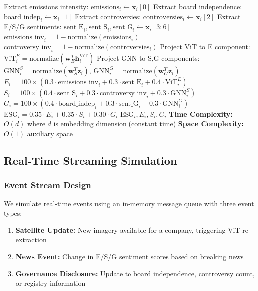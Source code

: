 \begin{algorithm}[H]
\caption{ESG Score Computation}
\label{alg:esg_scoring}
\BlankLine
{}
Extract emissions intensity: $\text{emissions}_i \gets \mathbf{x}_i[0]$\;
Extract board independence: $\text{board\_indep}_i \gets \mathbf{x}_i[1]$\;
Extract controversies: $\text{controversies}_i \gets \mathbf{x}_i[2]$\;
Extract E/S/G sentiments: $\text{sent\_E}_i, \text{sent\_S}_i, \text{sent\_G}_i \gets \mathbf{x}_i[3:6]$\;
\BlankLine
{}
$\text{emissions\_inv}_i = 1 - \text{normalize}(\text{emissions}_i)$\;
$\text{controversy\_inv}_i = 1 - \text{normalize}(\text{controversies}_i)$\;
Project ViT to E component: $\text{ViT}_i^E = \text{normalize}(\mathbf{w}_E^T \mathbf{h}_i^{\text{ViT}})$\;
Project GNN to S,G components: $\text{GNN}_i^S = \text{normalize}(\mathbf{w}_S^T \mathbf{z}_i)$, $\text{GNN}_i^G = \text{normalize}(\mathbf{w}_G^T \mathbf{z}_i)$\;
\BlankLine
{}
$E_i = 100 \times (0.3 \cdot \text{emissions\_inv}_i + 0.3 \cdot \text{sent\_E}_i + 0.4 \cdot \text{ViT}_i^E)$\;
$S_i = 100 \times (0.4 \cdot \text{sent\_S}_i + 0.3 \cdot \text{controversy\_inv}_i + 0.3 \cdot \text{GNN}_i^S)$\;
$G_i = 100 \times (0.4 \cdot \text{board\_indep}_i + 0.3 \cdot \text{sent\_G}_i + 0.3 \cdot \text{GNN}_i^G)$\;
\BlankLine
{}
$\text{ESG}_i = 0.35 \cdot E_i + 0.35 \cdot S_i + 0.30 \cdot G_i$\;
\Return $\text{ESG}_i, E_i, S_i, G_i$\;
\BlankLine
\textbf{Time Complexity:} $O(d)$ where $d$ is embedding dimension (constant time)\;
\textbf{Space Complexity:} $O(1)$ auxiliary space\;
\end{algorithm}

\subsection{Real-Time Streaming Simulation}

\subsubsection{Event Stream Design}

We simulate real-time events using an in-memory message queue with three event types:

\begin{enumerate}
\item \textbf{Satellite Update:} New imagery available for a company, triggering ViT re-extraction
\item \textbf{News Event:} Change in E/S/G sentiment scores based on breaking news
\item \textbf{Governance Disclosure:} Update to board independence, controversy count, or registry information
\end{enumerate}

